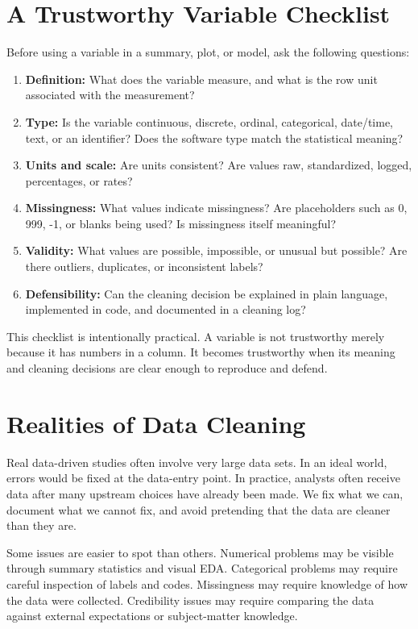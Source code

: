 {\section{A Trustworthy Variable Checklist}

Before using a variable in a summary, plot, or model, ask the following questions:
\begin{enumerate}
  \item \textbf{Definition:} What does the variable measure, and what is the row unit associated with the measurement?
  \item \textbf{Type:} Is the variable continuous, discrete, ordinal, categorical, date/time, text, or an identifier?  Does the software type match the statistical meaning?
  \item \textbf{Units and scale:} Are units consistent?  Are values raw, standardized, logged, percentages, or rates?
  \item \textbf{Missingness:} What values indicate missingness?  Are placeholders such as 0, 999, -1, or blanks being used?  Is missingness itself meaningful?
  \item \textbf{Validity:} What values are possible, impossible, or unusual but possible?  Are there outliers, duplicates, or inconsistent labels?
  \item \textbf{Defensibility:} Can the cleaning decision be explained in plain language, implemented in code, and documented in a cleaning log?
\end{enumerate}

This checklist is intentionally practical.  A variable is not trustworthy merely because it has numbers in a column.  It becomes trustworthy when its meaning and cleaning decisions are clear enough to reproduce and defend.

\section{Realities of Data Cleaning}

Real data-driven studies often involve very large data sets.  In an ideal world, errors would be fixed at the data-entry point.  In practice, analysts often receive data after many upstream choices have already been made.  We fix what we can, document what we cannot fix, and avoid pretending that the data are cleaner than they are.

Some issues are easier to spot than others.  Numerical problems may be visible through summary statistics and visual EDA.  Categorical problems may require careful inspection of labels and codes.  Missingness may require knowledge of how the data were collected.  Credibility issues may require comparing the data against external expectations or subject-matter knowledge.

}
